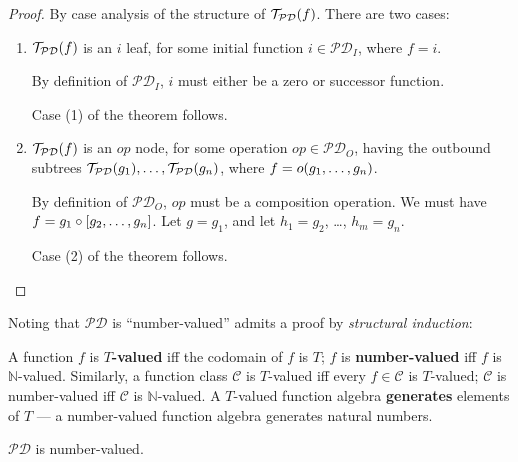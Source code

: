 \begin{proof} By case analysis of the structure of
$\mathcal{T}_\mathcal{PD}{\mathopen{}\left({f}\right)\mathclose{}}$.  There are two
cases:\begin{enumerate}[label=(\arabic*)]

\item $\mathcal{T}_\mathcal{PD}{\mathopen{}\left({f}\right)\mathclose{}}$ is an $i$ leaf, for some initial function
$i \in \mathcal{PD}_I$, where $f = i$.

By definition of $\mathcal{PD}_I$, $i$ must either be a zero or successor
function.

Case (1) of the theorem follows.

\item $\mathcal{T}_\mathcal{PD}{\mathopen{}\left({f}\right)\mathclose{}}$ is an $op$ node, for some operation $op
\in \mathcal{PD}_O$, having the outbound subtrees
$\mathcal{T}_\mathcal{PD}{\mathopen{}\left({g_1}\right)\mathclose{}}, \ldots, \mathcal{T}_\mathcal{PD}{\mathopen{}\left({g_n}\right)\mathclose{}}$,
where $f = o{\mathopen{}\left({g_1, \ldots, g_n}\right)\mathclose{}}$.

By definition of $\mathcal{PD}_O$, $op$ must be a composition operation. We
must have $f = g_1 \circ \mathopen{}\left[{g_2,\ldots, g_n}\right]\mathclose{}$. Let $g = g_1$, and let $h_1 =
g_2$, \ldots, $h_m = g_n$.

Case (2) of the theorem follows.\end{enumerate}\end{proof}

Noting that $\mathcal{PD}$ is ``number-valued'' admits a proof by
\emph{structural induction}:

\begin{definition} A function $f$ is \textbf{$T$-valued} iff the codomain of
$f$ is $T$; $f$ is \textbf{number-valued} iff $f$ is $\mathbb{N}$-valued.
Similarly, a function class $\mathcal{C}$ is $T$-valued iff every $f \in
\mathcal{C}$ is $T$-valued; $\mathcal{C}$ is number-valued iff $\mathcal{C}$ is
$\mathbb{N}$-valued. A $T$-valued function algebra \textbf{generates} elements
of $T$ --- a number-valued function algebra generates natural numbers.
 
 \end{definition}

\begin{theorem} \label{thm:p-number-valued} $\mathcal{PD}$ is number-valued.
\end{theorem}

